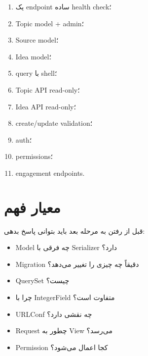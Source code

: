 \begin{enumerate}
  \item یک endpoint ساده health check؛
  \item Topic model + admin؛
  \item Source model؛
  \item Idea model؛
  \item query با shell؛
  \item Topic API read-only؛
  \item Idea API read-only؛
  \item create/update validation؛
  \item auth؛
  \item permissions؛
  \item engagement endpoints.
\end{enumerate}

\section{معیار فهم}

قبل از رفتن به مرحله بعد باید بتوانی پاسخ بدهی:
\begin{itemize}
  \item Model چه فرقی با Serializer دارد؟
  \item Migration دقیقاً چه چیزی را تغییر می‌دهد؟
  \item QuerySet چیست؟
  \item چرا  با IntegerField متفاوت است؟
  \item URLConf چه نقشی دارد؟
  \item Request چطور به View می‌رسد؟
  \item Permission کجا اعمال می‌شود؟
\end{itemize}
